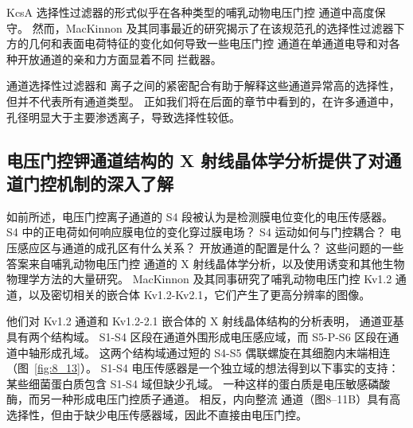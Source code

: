 KcsA 选择性过滤器的形式似乎在各种类型的哺乳动物电压门控  通道中高度保守。
然而，MacKinnon 及其同事最近的研究揭示了在该规范孔的选择性过滤器下方的几何和表面电荷特征的变化如何导致一些电压门控  通道在单通道电导和对各种开放通道的亲和力方面显着不同 拦截器。


 通道选择性过滤器和  离子之间的紧密配合有助于解释这些通道异常高的选择性，但并不代表所有通道类型。
正如我们将在后面的章节中看到的，在许多通道中，孔径明显大于主要渗透离子，导致选择性较低。



\subsection{电压门控钾通道结构的 X 射线晶体学分析提供了对通道门控机制的深入了解}

如前所述，电压门控离子通道的 S4 段被认为是检测膜电位变化的电压传感器。
S4 中的正电荷如何响应膜电位的变化穿过膜电场？
S4 运动如何与门控耦合？
电压感应区与通道的成孔区有什么关系？
开放通道的配置是什么？
这些问题的一些答案来自哺乳动物电压门控  通道的 X 射线晶体学分析，以及使用诱变和其他生物物理学方法的大量研究。
MacKinnon 及其同事研究了哺乳动物电压门控 Kv1.2  通道，以及密切相关的嵌合体 Kv1.2-Kv2.1，它们产生了更高分辨率的图像。


他们对 Kv1.2 通道和 Kv1.2-2.1 嵌合体的 X 射线晶体结构的分析表明， 通道亚基具有两个结构域。
S1-S4 区段在通道外围形成电压感应域，而 S5-P-S6 区段在通道中轴形成孔域。
这两个结构域通过短的 S4-S5 偶联螺旋在其细胞内末端相连（图~\ref{fig:8_13}）。
S1-S4 电压传感器是一个独立域的想法得到以下事实的支持：某些细菌蛋白质包含 S1-S4 域但缺少孔域。
一种这样的蛋白质是电压敏感磷酸酶，而另一种形成电压门控质子通道。
相反，内向整流  通道（图8–11B）具有高  选择性，但由于缺少电压传感器域，因此不直接由电压门控。


